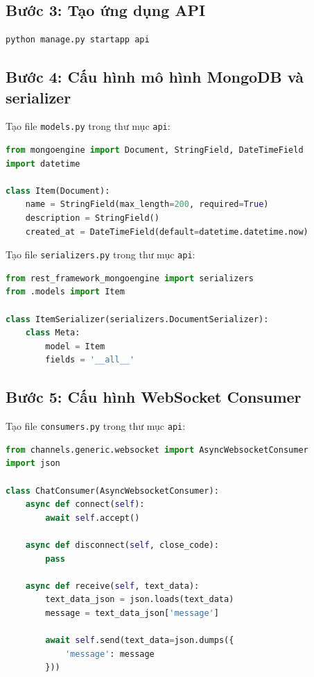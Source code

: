 \subsection{Bước 3: Tạo ứng dụng API}

\begin{lstlisting}[language=bash]
python manage.py startapp api
\end{lstlisting}

\subsection{Bước 4: Cấu hình mô hình MongoDB và serializer}

Tạo file \texttt{models.py} trong thư mục \texttt{api}:

\begin{lstlisting}[language=python]
from mongoengine import Document, StringField, DateTimeField
import datetime

class Item(Document):
    name = StringField(max_length=200, required=True)
    description = StringField()
    created_at = DateTimeField(default=datetime.datetime.now)
\end{lstlisting}

Tạo file \texttt{serializers.py} trong thư mục \texttt{api}:

\begin{lstlisting}[language=python]
from rest_framework_mongoengine import serializers
from .models import Item

class ItemSerializer(serializers.DocumentSerializer):
    class Meta:
        model = Item
        fields = '__all__'
\end{lstlisting}

\subsection{Bước 5: Cấu hình WebSocket Consumer}

Tạo file \texttt{consumers.py} trong thư mục \texttt{api}:

\begin{lstlisting}[language=python]
from channels.generic.websocket import AsyncWebsocketConsumer
import json

class ChatConsumer(AsyncWebsocketConsumer):
    async def connect(self):
        await self.accept()

    async def disconnect(self, close_code):
        pass

    async def receive(self, text_data):
        text_data_json = json.loads(text_data)
        message = text_data_json['message']
        
        await self.send(text_data=json.dumps({
            'message': message
        }))
\end{lstlisting}

